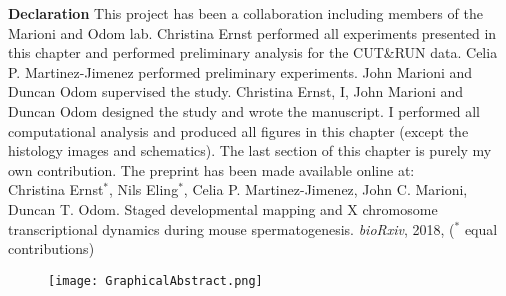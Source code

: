 \vspace*{\fill}

\newpage

\vspace*{\fill}

\begin{Comment}
\textbf{Declaration} This project has been a collaboration including members of the Marioni and Odom lab. Christina Ernst performed all experiments presented in this chapter and performed preliminary analysis for the CUT\&{}RUN data. Celia P. Martinez-Jimenez performed preliminary experiments. John Marioni and Duncan Odom supervised the study. Christina Ernst, I, John Marioni and Duncan Odom designed the study and wrote the manuscript. I performed all computational analysis and produced all figures in this chapter (except the histology images and schematics). The last section of this chapter is purely my own contribution. The preprint has been made available online at:\\

Christina Ernst$^\ast$, Nils Eling$^\ast$, Celia P. Martinez-Jimenez, John C. Marioni, Duncan T. Odom. Staged developmental mapping and X chromosome transcriptional dynamics during mouse spermatogenesis. \emph{bioRxiv}, 2018, ($^\ast$ equal contributions)
\end{Comment}

\vspace*{\fill}

\begin{figure}[hb]
\centering    
\texttt{[image: GraphicalAbstract.png]}
\caption*{}
\end{figure}

\vspace*{\fill}


\newpage


\newpage

\newpage


